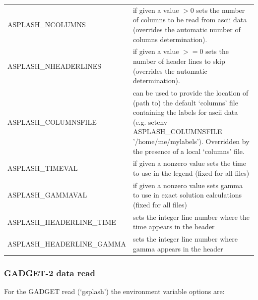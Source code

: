 \documentclass[a4paper,10pt]{article}
\begin{document}
\begin{tabular}{p{}p{}}
ASPLASH\_NCOLUMNS & if given a value $>$0 sets the number of columns to be read from ascii data (overrides the automatic number of
columns determination). \\
ASPLASH\_NHEADERLINES & if given a value $>=$0 sets the number of header lines to skip (overrides the automatic determination). \\
ASPLASH\_COLUMNSFILE & can be used to provide the location of (path to) the default `columns' file containing the labels for ascii data (e.g. setenv ASPLASH\_COLUMNSFILE '/home/me/mylabels'). Overridden by the presence of a local `columns' file. \\
ASPLASH\_TIMEVAL & if given a nonzero value sets the time to use in the legend (fixed for all files) \\
ASPLASH\_GAMMAVAL & if given a nonzero value sets gamma to use in exact solution calculations (fixed for all files) \\
ASPLASH\_HEADERLINE\_TIME & sets the integer line number where the time appears in the header \\
ASPLASH\_HEADERLINE\_GAMMA & sets the integer line number where gamma appears in the header \\
\end{tabular}

\subsubsection{ GADGET-2 data read}
\label{sec:gsplash}
 For the GADGET read (`gsplash') the environment variable options are:\newline
\end{document}
